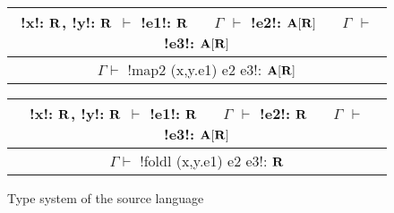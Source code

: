 \begin{figure*}[tb]
    \begin{tabular}{c}
        !x!: $\mathbf{R}$, !y!: $\mathbf{R}$ $\vdash$ !e1!: $\mathbf{R}$ 
        $\quad$ $\Gamma$ $\vdash$ !e2!: $\mathbf{A}[\mathbf{R}]$
        $\quad$ $\Gamma$ $\vdash$ !e3!: $\mathbf{A}[\mathbf{R}]$
        \\\hline  
        $\Gamma \vdash$ !map2 (x,y.e1) e2 e3!: $\mathbf{A}[\mathbf{R}]$
    \end{tabular}

    \begin{tabular}{c}
        !x!: $\mathbf{R}$, !y!: $\mathbf{R}$ $\vdash$ !e1!: $\mathbf{R}$ 
        $\quad$ $\Gamma$ $\vdash$ !e2!: $\mathbf{R}$
        $\quad$ $\Gamma$ $\vdash$ !e3!: $\mathbf{A}[\mathbf{R}]$
        \\\hline  
        $\Gamma \vdash$ !foldl (x,y.e1) e2 e3!: $\mathbf{R}$
    \end{tabular}
    \vspace{-0.2cm}
    \caption{Type system of the source language}
    \vspace{-0.4cm}
    \label{fig:source_typesystem}
    \end{figure*}